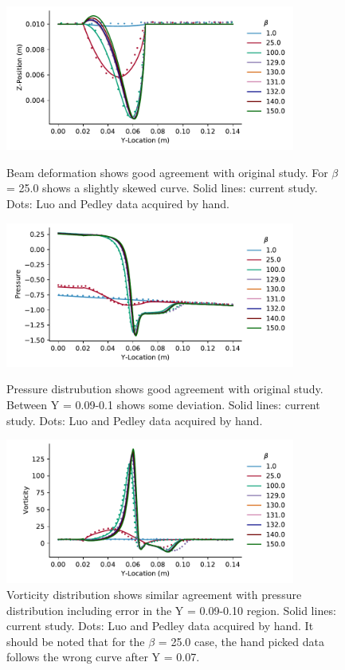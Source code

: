 \documentclass[10pt,english]{article}
\begin{document}
\begin{figure}[h!]
\centering
\vspace{-0pt}
\includegraphics[trim={.0cm 0cm .0cm 0cm},clip,width=0.85\textwidth]{fig5_def}
\caption{Beam deformation shows good agreement with original study. For $\beta$ = 25.0 shows a slightly skewed curve.  Solid lines: current study.  Dots: Luo and Pedley data acquired by hand. }
\label{f:fig5_def}

\centering
\vspace{-0pt}
\includegraphics[trim={.0cm 0cm .0cm 0cm},clip,width=0.85\textwidth]{fig5_press}
\caption{Pressure distrubution shows good agreement with original study.  Between Y = 0.09-0.1 shows some deviation.  Solid lines: current study.  Dots: Luo and Pedley data acquired by hand.}
\label{f:fig5_press}

\centering
\vspace{-0pt}
\includegraphics[trim={.0cm 0cm .0cm 0cm},clip,width=0.85\textwidth]{fig5_vor}
\caption{Vorticity distribution shows similar agreement with pressure distribution including error in the Y = 0.09-0.10 region. Solid lines: current study.  Dots: Luo and Pedley data acquired by hand.  It should be noted that for the $\beta$ = 25.0 case, the hand picked data follows the wrong curve after Y = 0.07.}
\label{f:fig5_vor}
\end{figure}
\end{document}
